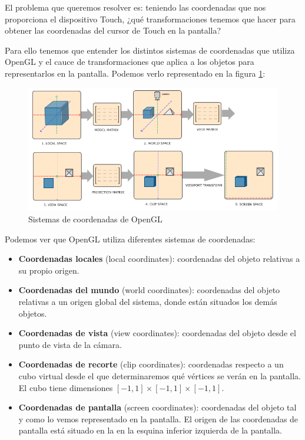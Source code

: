 \documentclass[a4paper,11pt, oneside]{book}
\begin{document}
El problema que queremos resolver es: teniendo las coordenadas que nos proporciona el dispositivo Touch, ¿qué transformaciones tenemos que hacer para obtener las coordenadas del cursor de Touch en la pantalla?


Para ello tenemos que entender los distintos sistemas de coordenadas que utiliza OpenGL y el cauce de transformaciones que aplica a los objetos para representarlos en la pantalla\cite{coordinates}. Podemos verlo representado en 
la figura \ref{fig:coordinates}:
\begin{figure}[H]
	\centering
	\includegraphics[width=\linewidth]{coordinate_systems}
	\caption{Sistemas de coordenadas de OpenGL \cite{coordinates}}
	\label{fig:coordinates}
	
\end{figure}


Podemos ver que OpenGL utiliza diferentes sistemas de coordenadas:
\begin{itemize}
	\item \textbf{Coordenadas locales} (local coordinates): coordenadas del objeto relativas a su propio origen.
	\item \textbf{Coordenadas del mundo} (world coordinates): coordenadas del objeto relativas a un origen global del sistema, donde están situados los demás objetos.
	\item \textbf{Coordenadas de vista} (view coordinates): coordenadas del objeto desde el punto de vista de la cámara.
	\item \textbf{Coordenadas de recorte} (clip coordinates): coordenadas respecto a un cubo virtual desde el que determinaremos qué vértices se verán en la pantalla. El cubo tiene dimensiones $[-1,1]\times [-1,1]\times [-1,1]$.
	\item \textbf{Coordenadas de pantalla} (screen coordinates): coordenadas del objeto tal y como lo vemos representado en la pantalla. El origen de las coordenadas de pantalla está situado en la en la esquina inferior izquierda de la pantalla.
\end{itemize} 
\end{document}
